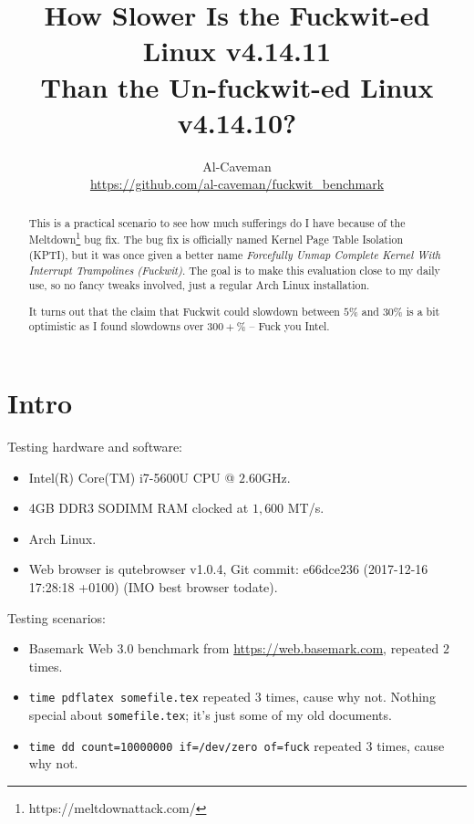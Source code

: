 \documentclass[12pt,a4paper,onecolumn, openright]{article}
\title{How Slower Is the Fuckwit-ed Linux v4.14.11\\
Than the Un-fuckwit-ed Linux v4.14.10?}
\author{Al-Caveman\\\url{https://github.com/al-caveman/fuckwit_benchmark}}
\begin{document}
\maketitle
\begin{abstract}
This is a practical scenario to see how much sufferings do I have because of
the Meltdown\footnote{https://meltdownattack.com/} bug fix. The bug fix is
officially named Kernel Page Table Isolation (KPTI), but it was once given a
better name \emph{Forcefully Unmap Complete Kernel With Interrupt Trampolines
(Fuckwit)}. The goal is to make this evaluation close to my daily use, so no
fancy tweaks involved, just a regular Arch Linux installation.

It turns out that the claim that Fuckwit could slowdown between
$5\%$ and $30\%$ is a bit optimistic as I found slowdowns over $300+\%$ -- Fuck
you Intel.
\end{abstract}

\section{Intro}
Testing hardware and software:
\begin{itemize}
    \item Intel(R) Core(TM) i7-5600U CPU @ $2.60$GHz.
    \item 4GB DDR3 SODIMM RAM clocked at $1,600$ MT/s.
    \item Arch Linux.
    \item Web browser is qutebrowser v1.0.4, Git commit: e66dce236 (2017-12-16
    17:28:18 +0100) (IMO best browser todate).
\end{itemize}
Testing scenarios:
\begin{itemize}
    \item Basemark Web 3.0 benchmark from \url{https://web.basemark.com},
    repeated $2$ times.
    \item \texttt{time pdflatex somefile.tex} repeated $3$ times, cause why
    not. Nothing special about \texttt{somefile.tex}; it's just some of my old
    documents.
    \item \texttt{time dd count=10000000 if=/dev/zero of=fuck} repeated $3$
    times, cause why not.
\end{itemize}
\end{document}
